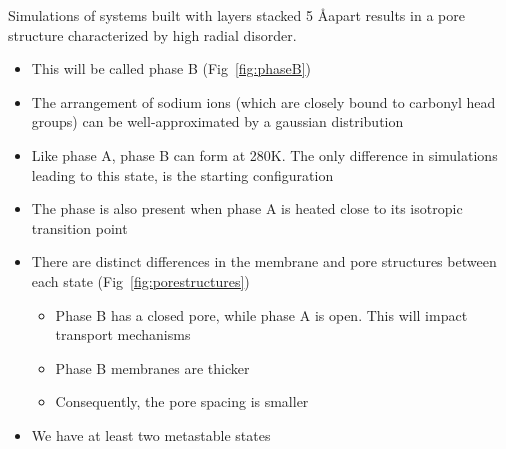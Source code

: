 \documentclass{article}
\newcommand{\angstrom}{\textup{\AA}}
\begin{document}
	Simulations of systems built with layers stacked 5 \angstrom apart results in a pore structure characterized by high radial disorder.
	\begin{itemize}
		\item This will be called phase B (Fig~\ref{fig:phaseB})
		\item The arrangement of sodium ions (which are closely bound to carbonyl head groups) can be well-approximated by a gaussian distribution %
		\item Like phase A, phase B can form at 280K. The only difference in simulations leading to this state, is the starting configuration
		\item The phase is also present when phase A is heated close to its isotropic transition point
		\item There are distinct differences in the membrane and pore structures between each state (Fig~\ref{fig:porestructures})
		\begin{itemize}
			\item Phase B has a closed pore, while phase A is open. This will impact transport mechanisms
			\item Phase B membranes are thicker
			\item Consequently, the pore spacing is smaller
		\end{itemize}
		\item We have at least two metastable states
	\end{itemize}
\end{document}
